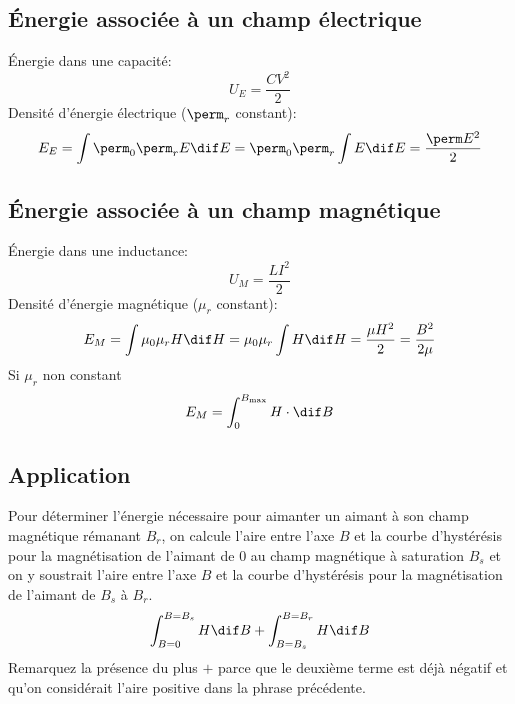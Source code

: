 \subsection{Énergie associée à un champ électrique}
Énergie dans une capacité:
\[ U_E = \frac{CV^2}{2} \]
Densité d'énergie électrique ($\perm_r$ constant):
\[ E_E = \int \perm_0 \perm_r E \dif E = \perm_0 \perm_r \int E \dif E = \frac{\perm E^2}{2} \]
\subsection{Énergie associée à un champ magnétique}
Énergie dans une inductance:
\[ U_M = \frac{LI^2}{2} \]
Densité d'énergie magnétique ($\mu_r$ constant):
\[ E_M = \int \mu_0 \mu_r H \dif H = \mu_0 \mu_r \int H \dif H = \frac{\mu H^2}{2} = \frac{B^2}{2\mu} \]
Si $\mu_r$ non constant
\[ E_M = \int_0^{B_\mathrm{max}} H \cdot \dif B \]

\subsection{Application}
Pour déterminer l'énergie nécessaire pour aimanter un aimant à son champ magnétique rémanant $B_r$,
on calcule l'aire entre l'axe $B$ et la courbe d'hystérésis pour la magnétisation de l'aimant de 0 au champ magnétique à saturation $B_s$ et on y soustrait l'aire entre l'axe $B$ et la courbe d'hystérésis pour la magnétisation de l'aimant de $B_s$ à $B_r$.
\[ \int_{B = 0}^{B = B_s} H \dif B + \int_{B = B_s}^{B = B_r} H \dif B \]
Remarquez la présence du plus $+$ parce que le deuxième terme est déjà négatif et qu'on considérait l'aire positive dans la phrase précédente.

